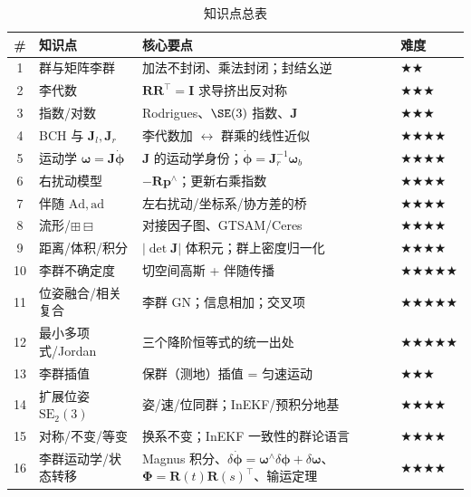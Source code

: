 \begin{table}[H]\centering\small
\caption{知识点总表}
\begin{tabular}{clll}
\toprule
\# & 知识点 & 核心要点 & 难度 \\
\midrule
1 & 群与矩阵李群 & 加法不封闭、乘法封闭；封结幺逆 & \(\bigstar\bigstar\) \\
2 & 李代数 & $\mathbf{R}\mathbf{R}^\top=\mathbf{I}$ 求导挤出反对称 & \(\bigstar\bigstar\bigstar\) \\
3 & 指数/对数 & Rodrigues、$\SE(3)$ 指数、$\mathbf{J}$ & \(\bigstar\bigstar\bigstar\) \\
4 & BCH 与 $\mathbf{J}_l,\mathbf{J}_r$ & 李代数加 $\leftrightarrow$ 群乘的线性近似 & \(\bigstar\bigstar\bigstar\bigstar\) \\
5 & 运动学 $\boldsymbol{\omega}=\mathbf{J}\dot{\boldsymbol{\phi}}$ & $\mathbf{J}$ 的运动学身份；$\dot{\boldsymbol{\phi}}=\mathbf{J}_r^{-1}\boldsymbol{\omega}_b$ & \(\bigstar\bigstar\bigstar\bigstar\) \\
6 & 右扰动模型 & $-\mathbf{R}\mathbf{p}^\wedge$；更新右乘指数 & \(\bigstar\bigstar\bigstar\bigstar\) \\
7 & 伴随 $\mathrm{Ad},\mathrm{ad}$ & 左右扰动/坐标系/协方差的桥 & \(\bigstar\bigstar\bigstar\bigstar\) \\
8 & 流形/$\boxplus\boxminus$ & 对接因子图、GTSAM/Ceres & \(\bigstar\bigstar\bigstar\bigstar\) \\
9 & 距离/体积/积分 & $|\det\mathbf{J}|$ 体积元；群上密度归一化 & \(\bigstar\bigstar\bigstar\bigstar\) \\
10 & 李群不确定度 & 切空间高斯 + 伴随传播 & \(\bigstar\bigstar\bigstar\bigstar\bigstar\) \\
11 & 位姿融合/相关复合 & 李群 GN；信息相加；交叉项 & \(\bigstar\bigstar\bigstar\bigstar\bigstar\) \\
12 & 最小多项式/Jordan & 三个降阶恒等式的统一出处 & \(\bigstar\bigstar\bigstar\bigstar\bigstar\) \\
13 & 李群插值 & 保群（测地）插值 = 匀速运动 & \(\bigstar\bigstar\bigstar\) \\
14 & 扩展位姿 $\mathrm{SE}_2(3)$ & 姿/速/位同群；InEKF/预积分地基 & \(\bigstar\bigstar\bigstar\bigstar\) \\
15 & 对称/不变/等变 & 换系不变；InEKF 一致性的群论语言 & \(\bigstar\bigstar\bigstar\bigstar\) \\
16 & 李群运动学/状态转移 & Magnus 积分、$\delta\dot{\boldsymbol{\phi}}=\boldsymbol{\omega}^\wedge\delta\boldsymbol{\phi}+\delta\boldsymbol{\omega}$、$\boldsymbol{\Phi}=\mathbf{R}(t)\mathbf{R}(s)^\top$、输运定理 & \(\bigstar\bigstar\bigstar\bigstar\) \\
\bottomrule
\end{tabular}
\end{table}

